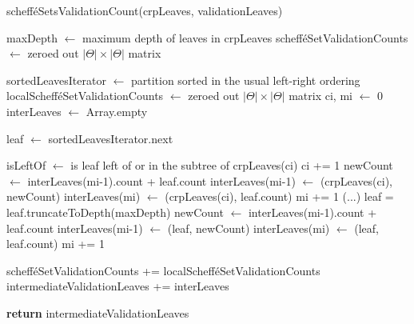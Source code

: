 \documentclass{report}
\begin{document}
\newpage
\thispagestyle{empty}
\begin{algorithm}[H]
\caption{schefféSetsValidationCount(crpLeaves, validationLeaves)}
\label{DSSC}


maxDepth $\leftarrow$ maximum depth of leaves in crpLeaves\;
schefféSetValidationCounts $\leftarrow$ zeroed out $|\Theta|\times|\Theta|$ matrix

{
	sortedLeavesIterator $\leftarrow$ partition sorted in the usual left-right ordering\;
	localSchefféSetValidationCounts $\leftarrow$ zeroed out $|\Theta|\times|\Theta|$ matrix\;
	ci, mi $\leftarrow$ 0 
	interLeaves $\leftarrow$ Array.empty 
	
	{
		leaf $\leftarrow$ sortedLeavesIterator.next\;

		isLeftOf $\leftarrow$ is leaf left of or in the subtree of crpLeaves(ci)\;
		{
			ci += 1\;
		}
		{
			{
				newCount $\leftarrow$ interLeaves(mi-1).count + leaf.count\;
				interLeaves(mi-1) $\leftarrow$ (crpLeaves(ci), newCount)\;
			}
			\Else
			{
				interLeaves(mi) $\leftarrow$ (crpLeaves(ci), leaf.count)\;
				mi += 1\;
			}
			(...)\;
		}
		\Else
		{
			leaf = leaf.truncateToDepth(maxDepth)\;
			{
				newCount $\leftarrow$ interLeaves(mi-1).count + leaf.count\;
				interLeaves(mi-1) $\leftarrow$ (leaf, newCount)\;
			}
			\Else
			{
				interLeaves(mi) $\leftarrow$ (leaf, leaf.count)\;
				mi += 1\;
			}
		}
	}

	schefféSetValidationCounts += localSchefféSetValidationCounts\;
	intermediateValidationLeaves += interLeaves\;
}

\textbf{return} intermediateValidationLeaves\;
\end{algorithm}
\end{document}
